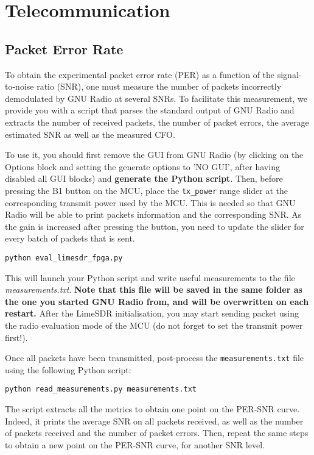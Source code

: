 \section{Telecommunication}
\subsection{Packet Error Rate}
To obtain the experimental packet error rate (PER) as a function of the signal-to-noise ratio (SNR), one must measure the number of packets incorrectly demodulated by GNU Radio at several SNRs. To facilitate this measurement, we provide you with a script that parses the standard output of GNU Radio and extracts the number of received packets, the number of packet errors, the average estimated SNR as well as the measured CFO.

To use it, you should first remove the GUI from GNU Radio (by clicking on the Options block and setting the generate options to 'NO GUI', after having disabled all GUI blocks) and \textbf{generate the Python script}. Then, before pressing the B1 button on the MCU, place the \texttt{tx\_power} range slider at the corresponding transmit power used by the MCU. This is needed so that GNU Radio will be able to print packets information and the corresponding SNR. As the gain is increased after pressing the button, you need to update the slider for every batch of packets that is sent.
    \begin{center}
    \texttt{python eval\_limesdr\_fpga.py}\\
    \end{center}
    This will launch your Python script and write useful measurements to the file \textit{measurements.txt}. \textbf{Note that this file will be saved in the same folder as the one you started GNU Radio from, and will be overwritten on each restart.} After the LimeSDR initialisation, you may start sending packet using the radio evaluation mode of the MCU (do not forget to set the transmit power first!).

Once all packets have been transmitted, post-process the \texttt{measurements.txt} file using the following Python script:
    \begin{center}
    \texttt{python read\_measurements.py measurements.txt}\\
    \end{center}
The script extracts all the metrics to obtain one point on the PER-SNR curve. Indeed, it prints the average SNR on all packets received, as well as the number of packets received and the number of packet errors. Then, repeat the same steps to obtain a new point on the PER-SNR curve, for another SNR level.


